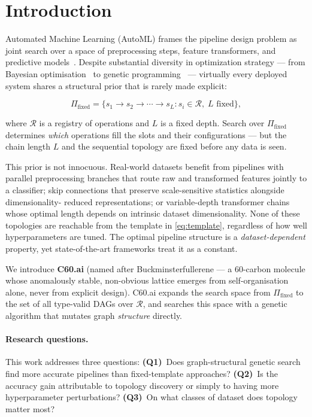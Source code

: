 \documentclass{article}
\theoremstyle{definition}
\theoremstyle{plain}
\theoremstyle{remark}
\begin{document}
\section{Introduction}

Automated Machine Learning (AutoML) frames the pipeline design problem as
joint search over a space of preprocessing steps, feature transformers, and
predictive models~\cite{hutter2019automated}.
Despite substantial diversity in optimization strategy — from Bayesian
optimisation~\cite{feurer2015efficient} to genetic
programming~\cite{olson2016tpot} — virtually every deployed system shares
a structural prior that is rarely made explicit:

\begin{equation}
  \Pi_{\mathrm{fixed}} = \bigl\{ s_1 \to s_2 \to \cdots \to s_L :
    s_i \in \mathcal{R},\; L \text{ fixed} \bigr\},
  \label{eq:template}
\end{equation}

\noindent where $\mathcal{R}$ is a registry of operations and $L$ is a fixed
depth.
Search over $\Pi_{\mathrm{fixed}}$ determines \emph{which} operations fill
the slots and their configurations — but the chain length $L$ and the
sequential topology are fixed before any data is seen.

This prior is not innocuous.
Real-world datasets benefit from pipelines with parallel preprocessing branches
that route raw and transformed features jointly to a classifier; skip
connections that preserve scale-sensitive statistics alongside dimensionality-
reduced representations; or variable-depth transformer chains whose optimal
length depends on intrinsic dataset dimensionality.
None of these topologies are reachable from the template in
\cref{eq:template}, regardless of how well hyperparameters are tuned.
The optimal pipeline structure is a \emph{dataset-dependent} property, yet
state-of-the-art frameworks treat it as a constant.

We introduce \textbf{C60.ai} (named after Buckminsterfullerene — a 60-carbon
molecule whose anomalously stable, non-obvious lattice emerges from
self-organisation alone, never from explicit design).
C60.ai expands the search space from $\Pi_{\mathrm{fixed}}$ to the set of all
type-valid DAGs over $\mathcal{R}$, and searches this space with a genetic
algorithm that mutates graph \emph{structure} directly.

\paragraph{Research questions.}
This work addresses three questions:
\textbf{(Q1)}~Does graph-structural genetic search find more accurate
pipelines than fixed-template approaches?
\textbf{(Q2)}~Is the accuracy gain attributable to topology discovery
or simply to having more hyperparameter perturbations?
\textbf{(Q3)}~On what classes of dataset does topology matter most?
\end{document}
